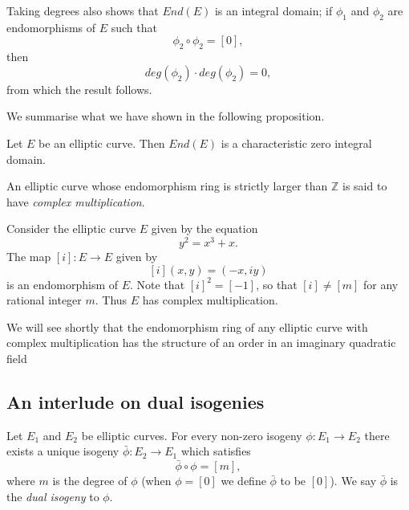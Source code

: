 Taking degrees also shows that $End(E)$ is an integral domain; if $\phi_{1}$ and
$\phi_{2}$ are endomorphisms of $E$ such that
\begin{equation*}
  \phi_{2} \circ \phi_{2} = \left[0\right],
\end{equation*}
then
\begin{equation*}
  deg \left( \phi_{2} \right) \cdot deg \left( \phi_{2} \right) = 0,
\end{equation*}
from which the result follows.

We summarise what we have shown in the following proposition.

\begin{prop}
  \label{prop:End(E)-is-char-zero-id}
  Let $E$ be an elliptic curve.  Then $End(E)$ is a characteristic zero integral
  domain.
\end{prop}

An elliptic curve whose endomorphism ring is strictly larger than $\mathbb{Z}$ is
said to have \emph{complex multiplication}.

\begin{example}
  \label{ex:cm-example}
  Consider the elliptic curve $E$ given by the equation
  \begin{equation*}
    y^{2} = x^{3} + x.
  \end{equation*}
  The map $\left[ i \right] \colon E \rightarrow E$ given by
  \begin{equation*}
    \left[ i \right](x,y) = (-x,iy)
  \end{equation*}
  is an endomorphism of $E$.  Note that $\left[ i \right]^{2} = \left[ -1 \right]$,
  so that $\left[ i \right] \neq \left[ m \right]$ for any rational integer $m$.
  Thus $E$ has complex multiplication.

  We will see shortly that the endomorphism ring of any elliptic curve with complex
  multiplication has the structure of an order in an imaginary quadratic field
\end{example}

\subsection{An interlude on dual isogenies}
\label{sec:an-interlude-dual}

Let $E_{1}$ and $E_{2}$ be elliptic curves.  For every non-zero isogeny $\phi \colon
E_{1} \rightarrow E_{2}$ there exists a unique isogeny $\bar{\phi} \colon E_{2}
\rightarrow E_{1}$ which satisfies
\begin{equation}
  \label{eq:dual-isogeny}
  \bar{\phi} \circ \phi = \left[ m \right],
\end{equation}
where $m$ is the degree of $\phi$ (when $\phi = \left[ 0 \right]$ we define
$\bar{\phi}$ to be $\left[ 0 \right]$).  We say $\bar{\phi}$ is the \emph{dual
  isogeny} to $\phi$.


